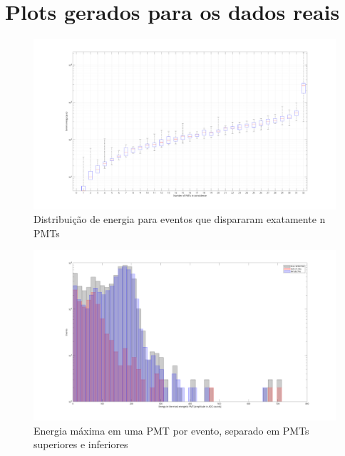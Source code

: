 \chapter{Plots gerados para os dados reais}\label{apdx:dadosreais}

\begin{figure}[H]
	\centering
	\includegraphics[width=16cm]{postextuais/apendice/dadosreais/boxplot.png}
	\caption{Distribuição de energia para eventos que dispararam exatamente n PMTs }
	\label{fig:transf}
\end{figure}

\begin{figure}[H]
	\centering
	\includegraphics[width=16cm]{postextuais/apendice/dadosreais/energ_max_adc.png}
	\caption{Energia máxima em uma PMT por evento, separado em PMTs superiores e inferiores }
	\label{fig:transf}
\end{figure}

